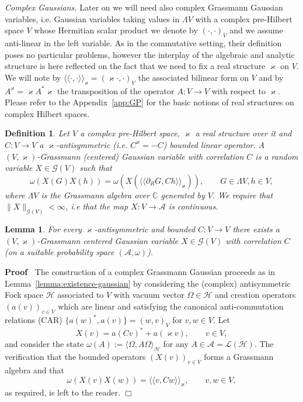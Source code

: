 \documentclass{article}
\newcommand{\assign}{:=}
\newcommand{\llangle}{{\langle\!\langle}}
\newcommand{\rrangle}{{\rangle\!\rangle}}
\newcommand{\tmtextit}[1]{{\itshape{#1}}}
\newenvironment{proof}{\noindent\textbf{Proof\ }}{\hspace*{\fill}$\Box$\medskip}
\newtheorem{definition}[theorem]{Definition}
\newtheorem{lemma}[theorem]{Lemma}
\begin{document}
\tmtextit{Complex Gaussians.} Later on we will need also complex Grassmann
Gaussian variables, i.e. Gaussian variables taking values in $\Lambda V$ with
a complex pre-Hilbert space $V$ whose Hermitian scalar product we denote by
$(\cdot, \cdot)_V$ and we assume anti-linear in the left variable. As in the
commutative setting, their definition poses no particular problems, however
the interplay of the algebraic and analytic structure is here reflected on the
fact that we need to fix a real structure $\varkappa$ on $V$. We will note by
$\llangle \cdot, \cdot \rrangle_{\varkappa} = (\varkappa \cdot, \cdot)_V$ the
associated bilinear form on $V$ and by $A^{\varkappa} = \varkappa A^{\ast}
\varkappa$ the transposition of the operator $A : V \rightarrow V$ with
respect to $\varkappa$. Please refer to the Appendix~\ref{app:GP} for the
basic notions of real structures on complex Hilbert spaces.

\begin{definition}
  \label{def:complex-gaussians}Let $V$ a complex pre-Hilbert space,
  $\varkappa$ a real structure over it and $C : V \rightarrow V$ a
  $\varkappa$-antisymmetric (i.e. $C^{\varkappa} = - C$) bounded linear
  operator. A \ $(V, \varkappa)$-Grassmann (centered) Gaussian variable with
  correlation $C$ is a random variable $X \in \mathcal{G} (V)$ such that
  \[ \omega (X (G) X (h)) = \omega (X (\llangle \partial_R G, C h
     \rrangle_{\varkappa})), \qquad G \in \Lambda V, h \in V, \]
  where $\Lambda V$ is the Grassmann algebra over $\mathbb{C}$ generated by
  $V$. We require that $\| X \|_{\mathcal{G} (V)} < \infty$, i.e that the map
  $X : V \rightarrow \mathcal{A}$ is continuous.
\end{definition}

\begin{lemma}
  \label{lemma:existence-complex-gaussian}For every $\varkappa$-antisymmetric
  and bounded $C : V \rightarrow V$ there exists a \ $(V,
  \varkappa)$-Grassmann centered Gaussian variable $X \in \mathcal{G} (V)$
  with correlation $C$ (on a suitable probability space $(\mathcal{A},
  \omega)$).
\end{lemma}

\begin{proof}
  The construction of a complex Grassmann Gaussian proceeds as in
  Lemma~\ref{lemma:existence-gaussian} by considering the (complex)
  antisymmetric Fock space $\mathcal{H}$ associated to $V$ with vacuum vector
  $\Omega \in \mathcal{H}$ and creation operators $(a (v))_{v \in V}$ which
  are linear and satisfying the canonical anti-commutation relations (CAR) $\{
  a (w)^{\ast}, a (v) \} = (w, v)_V$ for $v, w \in V$. Let
  \[ X (v) = a (C v)^{\ast} + a (\varkappa v), \qquad v \in V, \]
  and consider the state $\omega (A) \assign \langle \Omega, A \Omega
  \rangle_{\mathcal{H}}$ for any $A \in \mathcal{A}=\mathcal{L}
  (\mathcal{H})$. The verification that the bounded operators $(X (v))_{v \in
  V}$ forms a Grassmann algebra and that
  \[ \omega (X (v) X (w)) = \llangle v, C w \rrangle_{\varkappa}, \qquad v, w
     \in V, \]
  as required, is left to the reader.
\end{proof}
\end{document}
